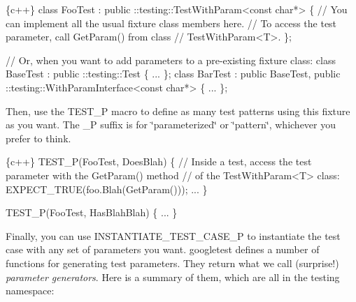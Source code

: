\begin{DoxyCode}
\{c++\}
class FooTest :
    public ::testing::TestWithParam<const char*> \{
  // You can implement all the usual fixture class members here.
  // To access the test parameter, call GetParam() from class
  // TestWithParam<T>.
\};

// Or, when you want to add parameters to a pre-existing fixture class:
class BaseTest : public ::testing::Test \{
  ...
\};
class BarTest : public BaseTest,
                public ::testing::WithParamInterface<const char*> \{
  ...
\};
\end{DoxyCode}


Then, use the {\ttfamily T\+E\+S\+T\+\_\+P} macro to define as many test patterns using this fixture as you want. The {\ttfamily \+\_\+P} suffix is for \char`\"{}parameterized\char`\"{} or \char`\"{}pattern\char`\"{}, whichever you prefer to think.


\begin{DoxyCode}
\{c++\}
TEST\_P(FooTest, DoesBlah) \{
  // Inside a test, access the test parameter with the GetParam() method
  // of the TestWithParam<T> class:
  EXPECT\_TRUE(foo.Blah(GetParam()));
  ...
\}

TEST\_P(FooTest, HasBlahBlah) \{
  ...
\}
\end{DoxyCode}


Finally, you can use {\ttfamily I\+N\+S\+T\+A\+N\+T\+I\+A\+T\+E\+\_\+\+T\+E\+S\+T\+\_\+\+C\+A\+S\+E\+\_\+P} to instantiate the test case with any set of parameters you want. googletest defines a number of functions for generating test parameters. They return what we call (surprise!) {\itshape parameter generators}. Here is a summary of them, which are all in the {\ttfamily testing} namespace\+:

